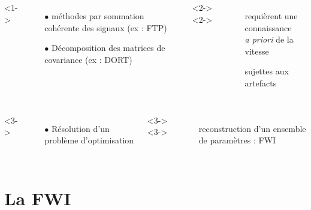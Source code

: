 \begin{frame}{\insertsectionhead}
\begin{small}
\begin{columns}[c]
	\end{columns}
	\begin{columns}[c]
			<1->
				\begin{itemize}
					\item[$\bullet$] méthodes par sommation cohérente des signaux (ex : FTP)
					\item[$\bullet$] Décomposition des matrices de covariance (ex : DORT)
				\end{itemize}
			<2->
			<2->
				\begin{itemize}
					\item[\ding{55}] requièrent une connaissance\\ \emph{a priori} de la vitesse\\
					\item[\ding{55}] sujettes aux artefacts
				\end{itemize}
	\end{columns}
	\vspace{0.1cm}
	\begin{columns}[c]
		<3->
			\begin{itemize}
				\item[$\bullet$] Résolution d'un problème d'optimisation
			\end{itemize}
		<3->
		<3->
			\begin{itemize}
			\item[\ding{51}] {reconstruction d'un ensemble de paramètres : FWI}
		\end{itemize}		
	\end{columns}
\end{small}
\end{frame} 


\section{La FWI}
